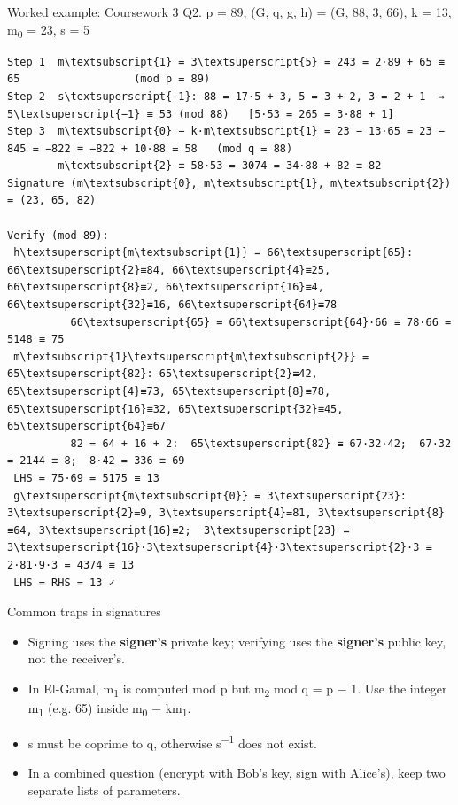 \documentclass[11pt,a4paper]{article}
\begin{document}
\begin{example}{Worked example: Coursework 3 Q2. p = 89, (G, q, g, h) = (G, 88, 3, 66), k = 13, m\textsubscript{0} = 23, s = 5}
\begin{workbox}
\begin{Verbatim}[commandchars=\\\{\},fontsize=\scriptsize]
Step 1  m\textsubscript{1} = 3\textsuperscript{5} = 243 = 2·89 + 65 ≡ 65                  (mod p = 89)
Step 2  s\textsuperscript{−1}: 88 = 17·5 + 3, 5 = 3 + 2, 3 = 2 + 1  ⇒  5\textsuperscript{−1} ≡ 53 (mod 88)   [5·53 = 265 = 3·88 + 1]
Step 3  m\textsubscript{0} − k·m\textsubscript{1} = 23 − 13·65 = 23 − 845 = −822 ≡ −822 + 10·88 = 58   (mod q = 88)
        m\textsubscript{2} ≡ 58·53 = 3074 = 34·88 + 82 ≡ 82
Signature (m\textsubscript{0}, m\textsubscript{1}, m\textsubscript{2}) = (23, 65, 82)

Verify (mod 89):
 h\textsuperscript{m\textsubscript{1}} = 66\textsuperscript{65}:  66\textsuperscript{2}≡84, 66\textsuperscript{4}≡25, 66\textsuperscript{8}≡2, 66\textsuperscript{16}≡4, 66\textsuperscript{32}≡16, 66\textsuperscript{64}≡78
          66\textsuperscript{65} = 66\textsuperscript{64}·66 ≡ 78·66 = 5148 ≡ 75
 m\textsubscript{1}\textsuperscript{m\textsubscript{2}} = 65\textsuperscript{82}: 65\textsuperscript{2}≡42, 65\textsuperscript{4}≡73, 65\textsuperscript{8}≡78, 65\textsuperscript{16}≡32, 65\textsuperscript{32}≡45, 65\textsuperscript{64}≡67
          82 = 64 + 16 + 2:  65\textsuperscript{82} ≡ 67·32·42;  67·32 = 2144 ≡ 8;  8·42 = 336 ≡ 69
 LHS = 75·69 = 5175 ≡ 13
 g\textsuperscript{m\textsubscript{0}} = 3\textsuperscript{23}: 3\textsuperscript{2}=9, 3\textsuperscript{4}=81, 3\textsuperscript{8}≡64, 3\textsuperscript{16}≡2;  3\textsuperscript{23} = 3\textsuperscript{16}·3\textsuperscript{4}·3\textsuperscript{2}·3 ≡ 2·81·9·3 = 4374 ≡ 13
 LHS = RHS = 13 ✓
\end{Verbatim}
\end{workbox}
\end{example}
\begin{trap}{Common traps in signatures}
\begin{itemize}
\item Signing uses the \textbf{signer's} private key; verifying uses the \textbf{signer's} public key, not the receiver's.
\item In El-Gamal, m\textsubscript{1} is computed mod p but m\textsubscript{2} mod q = p \ensuremath{-} 1. Use the integer m\textsubscript{1} (e.g. 65) inside m\textsubscript{0} \ensuremath{-} km\textsubscript{1}.
\item s must be coprime to q, otherwise s\textsuperscript{\ensuremath{-}1} does not exist.
\item In a combined question (encrypt with Bob's key, sign with Alice's), keep two separate lists of parameters.
\end{itemize}
\end{trap}
\end{document}
